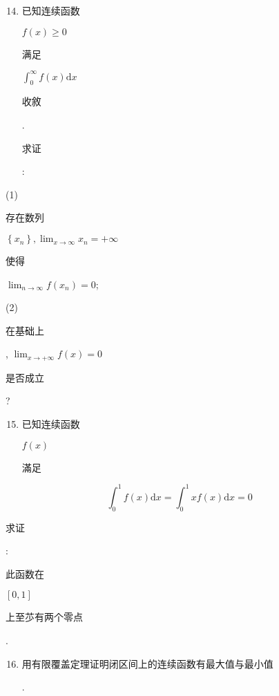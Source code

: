 \documentclass[10pt]{article}
\begin{document}
\begin{enumerate}
  \setcounter{enumi}{13}
  \item \begin{CJK}{UTF8}{mj}已知连续函数\end{CJK} $f(x) \geqslant 0$ \begin{CJK}{UTF8}{mj}满足\end{CJK} $\int_{0}^{\infty} f(x) \mathrm{d} x$ \begin{CJK}{UTF8}{mj}收敘\end{CJK}. \begin{CJK}{UTF8}{mj}求证\end{CJK}:
\end{enumerate}
(1) \begin{CJK}{UTF8}{mj}存在数列\end{CJK} $\left\{x_{n}\right\}, \lim _{x \rightarrow \infty} x_{n}=+\infty$ \begin{CJK}{UTF8}{mj}使得\end{CJK} $\lim _{n \rightarrow \infty} f\left(x_{n}\right)=0$;

(2) \begin{CJK}{UTF8}{mj}在基础上\end{CJK}, $\lim _{x \rightarrow+\infty} f(x)=0$ \begin{CJK}{UTF8}{mj}是否成立\end{CJK}?

\begin{enumerate}
  \setcounter{enumi}{14}
  \item \begin{CJK}{UTF8}{mj}已知连续函数\end{CJK} $f(x)$ \begin{CJK}{UTF8}{mj}滿足\end{CJK}
\end{enumerate}
$$
\int_{0}^{1} f(x) \mathrm{d} x=\int_{0}^{1} x f(x) \mathrm{d} x=0
$$
\begin{CJK}{UTF8}{mj}求证\end{CJK}: \begin{CJK}{UTF8}{mj}此函数在\end{CJK} $[0,1]$ \begin{CJK}{UTF8}{mj}上至䒚有两个零点\end{CJK}.

\begin{enumerate}
  \setcounter{enumi}{15}
  \item \begin{CJK}{UTF8}{mj}用有限覆盖定理证明闭区间上的连续函数有最大值与最小值\end{CJK}.
\end{enumerate}
\end{document}
